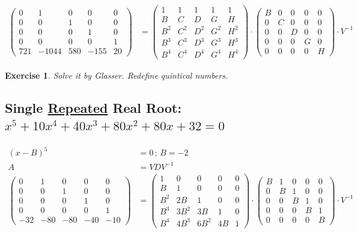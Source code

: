\documentclass[12pt,a4paper]{article}
\newtheorem{exercise}{Exercise}[section]
\begin{document}
\begin{align}
\left( \begin{matrix} 0&1&0&0&0 \\ 0&0&1&0&0 \\ 0&0&0&1&0 \\ 0&0&0&0&1 \\ 721 & -1044 & 580 & -155 & 20 \end{matrix} \right)
&=
\left( \begin{matrix} 1&1&1&1&1 \\ B&C&D&G&H \\ B^2&C^2&D^2&G^2&H^2 \\ B^3&C^3&D^3&G^3&H^3 \\ B^4&C^4&D^4&G^4&H^4 \end{matrix} \right) \cdot
\left( \begin{matrix} B & 0&0&0&0 \\ 0 & C&0&0&0 \\ 0 & 0 & D & 0 & 0 \\ 0 & 0 & 0 & G & 0 \\ 0 & 0 & 0 & 0 & H \end{matrix} \right) \cdot
V^{-1}
\end{align}

\begin{exercise}
Solve it by Glasser. Redefine quintical numbers.
\end{exercise}

\subsection{Single \href{}{Repeated} Real Root: $x^5 + 10 x^4 + 40 x^3 + 80 x^2 + 80x + 32 = 0$}

\begin{align}
(x - B)^5 &= 0\,;\,B = -2 \\
A &= VDV^{-1} \\
\left( \begin{matrix} 0&1&0&0&0 \\ 0&0&1&0&0 \\ 0&0&0&1&0 \\ 0&0&0&0&1 \\ -32 & -80 & -80 & -40 & -10 \end{matrix} \right)
&=
\left( \begin{matrix} 1&0&0&0&0 \\ B&1&0&0&0 \\ B^2&2B&1&0&0 \\ B^3&3B^2&3B&1&0 \\ B^4&4B^3&6B^2&4B&1 \end{matrix} \right) \cdot
\left( \begin{matrix} B & 1&0&0&0 \\ 0 & B&1&0&0 \\ 0 & 0 & B & 1 & 0 \\ 0 & 0 & 0 & B & 1 \\ 0 & 0 & 0 & 0 & B \end{matrix} \right) \cdot V^{-1}
\end{align}
\end{document}
